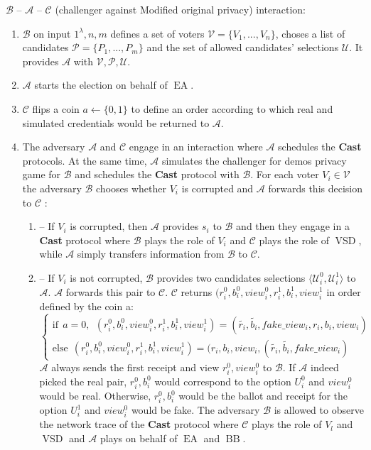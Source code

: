 \documentclass[12pt]{article}
\DeclareMathOperator{\vsd}{VSD}
\DeclareMathOperator{\ea}{EA}
\DeclareMathOperator{\bb}{BB}
\begin{document}
$\mathcal{B}$ -- $\mathcal{A}$ -- $\mathcal{C}$ (challenger against Modified original privacy) interaction: 
\begin{enumerate}
\item $\mathcal{B}$ on input $1^{\lambda},n,m$ defines a set of voters  $\mathcal{V} = \{V_1,...,V_n\}$, choses a list of candidates  $\mathcal{P} = \{P_1,...,P_m\}$ and the set of allowed candidates' selections $\mathcal{U}$.  It provides $\mathcal{A}$ with $\mathcal{V}, \mathcal{P}, \mathcal{U}$.
 \item $\mathcal{A}$ starts the election on behalf of $\ea$.
 \item $\mathcal{C}$ flips a coin $a \leftarrow \{0,1\}$ to define an order according to which real and simulated credentials would be returned to $\mathcal{A}$. 
 \item The adversary $\mathcal{A}$  and $\mathcal{C}$ engage in an interaction where $\mathcal{A}$ schedules the \textbf{Cast} protocols. At the same time, $\mathcal{A}$ simulates the challenger for demos privacy game for $\mathcal{B}$ and schedules the  \textbf{Cast}  protocol with $\mathcal{B}$. For each voter  $V_i \in \mathcal{V}$ the adversary $\mathcal{B}$  chooses whether $V_i$ is corrupted and $\mathcal{A}$ forwards this decision to $\mathcal{C}$ :
 \begin{enumerate}
\item[] -- If $V_i$ is corrupted, then $\mathcal{A}$ provides $s_i$ to $\mathcal{B}$ and then they engage in a \textbf{Cast} protocol where  $\mathcal{B}$ plays the role of $V_i$ and  $\mathcal{C}$ plays the role of $\vsd$, while $\mathcal{A}$ simply transfers information from $\mathcal{B}$ to $\mathcal{C}$.
\item[] --  If $V_i$ is not corrupted, $\mathcal{B}$ provides two candidates selections $\langle \mathcal{U}^0_i , \mathcal{U}^1_i \rangle$ to $\mathcal{A}$. $\mathcal{A}$ forwards this pair to $\mathcal{C}$.  $\mathcal{C}$ returns $(r_i^0,b_i^0,view_i^0,r_i^1,b_i^1,view_i^1$ in order defined by the coin a:\\
$ \begin{cases}
 \text{if} ~~a =0,~~ (r_i^0,b_i^0,view_i^0,r_i^1,b_i^1,view_i^1) = (\tilde{r_i},\tilde{b_i},fake\_view_i,r_i,b_i,view_i)  \\ 
 \text{else}~~  (r_i^0,b_i^0,view_i^0,r_i^1,b_i^1,view_i^1) = (r_i,b_i,view_i,(\tilde{r_i},\tilde{b_i},fake\_view_i)
\end{cases}$\\
$\mathcal{A}$ always sends the first receipt and view $r^0_i,view_i^0$ to  $\mathcal{B}$.  If  $\mathcal{A}$ indeed picked the real pair, $r_i^0,b_i^0$ would correspond to the option  $U^0_i$  and $view_i^0$ would be real. Otherwise, $r_i^0,b_i^0$ would be the ballot and receipt for the option  $U^1_i$ and $view_i^0$ would be fake. The adversary  $\mathcal{B}$ is allowed to observe the network trace of the \textbf{Cast} protocol where $\mathcal{C}$ plays the role of $V_l$ and $\vsd$ and  $\mathcal{A}$ plays on behalf of $\ea$ and $\bb$. 

\end{enumerate}
\end{enumerate}
\end{document}
